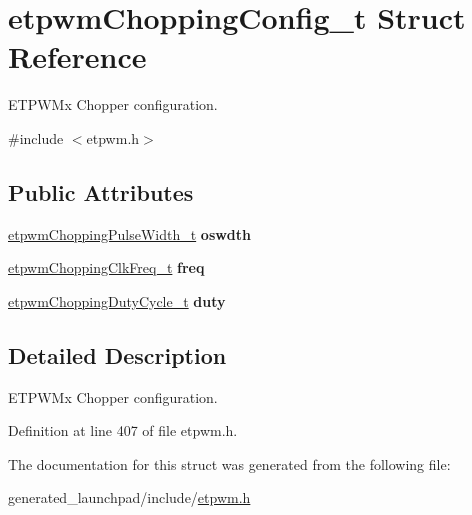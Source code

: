 \hypertarget{structetpwmChoppingConfig__t}{}\section{etpwm\+Chopping\+Config\+\_\+t Struct Reference}
\label{structetpwmChoppingConfig__t}


E\+T\+P\+W\+Mx Chopper configuration.  




{\ttfamily \#include $<$etpwm.\+h$>$}

\subsection*{Public Attributes}
\begin{DoxyCompactItemize}
\item 
\mbox{\label{structetpwmChoppingConfig__t_ab1839a075eb2e496c14f8e2ed8bbd97f}} 
\mbox{\hyperlink{etpwm_8h_a0438be91701ec609294a76b9d3c8d614}{etpwm\+Chopping\+Pulse\+Width\+\_\+t}} {\bfseries oswdth}
\item 
\mbox{\label{structetpwmChoppingConfig__t_acd742d228249ff2e67e0b015aa042f46}} 
\mbox{\hyperlink{etpwm_8h_ab2e66b21c70a9ca5db3d872017e113a6}{etpwm\+Chopping\+Clk\+Freq\+\_\+t}} {\bfseries freq}
\item 
\mbox{\label{structetpwmChoppingConfig__t_a60b10fe267b1dabce85e4484d93a726d}} 
\mbox{\hyperlink{etpwm_8h_aa7f9bda767c0fc115ebf5df8df14e210}{etpwm\+Chopping\+Duty\+Cycle\+\_\+t}} {\bfseries duty}
\end{DoxyCompactItemize}


\subsection{Detailed Description}
E\+T\+P\+W\+Mx Chopper configuration. 

Definition at line 407 of file etpwm.\+h.



The documentation for this struct was generated from the following file\+:\begin{DoxyCompactItemize}
\item 
generated\+\_\+launchpad/include/\mbox{\hyperlink{etpwm_8h}{etpwm.\+h}}\end{DoxyCompactItemize}
